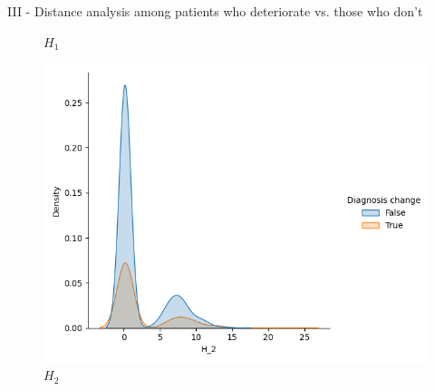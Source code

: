 \documentclass[aspectratio=169, 10pt, dvipsnames]{beamer}
\begin{document}
\begin{frame}[fragile]{III - Distance analysis among patients who deteriorate vs. those who don't}
\begin{figure}
    \caption{$H_1$}
  \end{figure}
  \endminipage
  \hfill
  \begin{figure}
    \centering
     \includegraphics[width=\textwidth]{figures/temporal_evolution/landscape_H_2_dist_diag_change.png}
    \caption{$H_2$}
  \end{figure}
  \endminipage
\end{frame}
\end{document}
